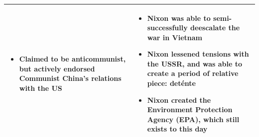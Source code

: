\documentclass[12pt,landscape]{article}
\begin{document}
\begin{center}
\begin{tabular}[h!]{| p{} | p{} |}
\begin{itemize}
      \item Claimed to be anticommunist, but actively endorsed Communist China's relations with the US
    \end{itemize} &
    \begin{itemize}
      \item Nixon was able to semi-successfully deescalate the war in Vietnam
      \item Nixon lessened tensions with the USSR, and was able to create a period of relative piece:  det\'ente
      \item Nixon created the Environment Protection Agency (EPA), which still exists to this day
    \end{itemize}\\
    \hline
  \end{tabular}
\end{center}
\end{document}
